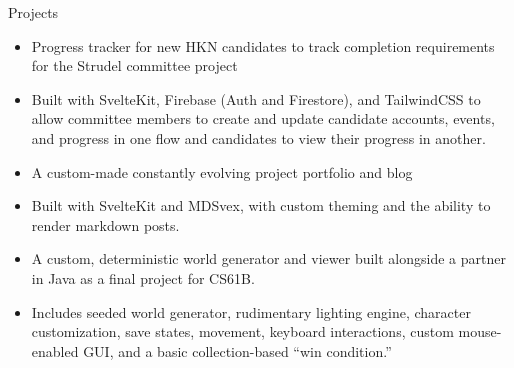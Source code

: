 \documentclass[10pt]{article}
\begin{document}
\begin{section}{Projects}
    \begin{sectionitem}[
        Title={Studrel Candidate Semester Tracker},
        TitleLink={https://github.com/jonahbedouch/studrel}, 
        Date={October 2023}, 
        ]
        \begin{itemize}
            \item Progress tracker for new HKN candidates to track completion requirements for the Strudel committee project
            \item Built with SvelteKit, Firebase (Auth and Firestore), and TailwindCSS to allow committee members to create and update candidate accounts, events, and progress in one flow and candidates to view their progress in another.
        \end{itemize}
    \end{sectionitem}

    \begin{sectionitem}[
        Title={Bedouch.net},
        TitleLink={https://bedouch.net}, 
        Date={December 2022}, 
        ]
        \begin{itemize}
            \item A custom-made constantly evolving project portfolio and blog
            \item Built with SvelteKit and MDSvex, with custom theming and the ability to render markdown posts.
        \end{itemize}
    \end{sectionitem}

    \begin{sectionitem}[
        Title={Build Your Own World (CS61B)},
        TitleLink={https://www.youtube.com/watch?v=CfOpw9so67s}, 
        Date={December 2022}, 
        ]
        \begin{itemize}
            \item A custom, deterministic world generator and viewer built alongside a partner in Java as a final project for CS61B.
            \item Includes seeded world generator, rudimentary lighting engine, character customization, save states, movement, keyboard interactions, custom mouse-enabled GUI, and a basic collection-based ``win condition.''
        \end{itemize}
    \end{sectionitem}
\end{section}
\end{document}

